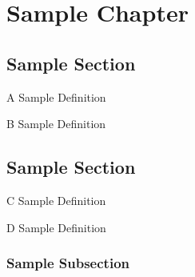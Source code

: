 \setcounter{chapter}{-1}
\chapter{Sample Chapter}
\section{Sample Section}
    \begin{definition}
        \label{sec:hoe}
        A Sample Definition \newline
        \blindtext
    \end{definition}
    \begin{definition}
        \label{sec:hello}
        B Sample Definition \newline
        \blindtext
    \end{definition}
    \section{Sample Section}
    \begin{definition}
        \label{sec:n}
        C Sample Definition \newline
        \blindtext
    \end{definition}
    \begin{definition}
        \label{sec:no}
        D Sample Definition \newline
        \blindtext
    \end{definition}
\subsection{Sample Subsection}
    \blindtext